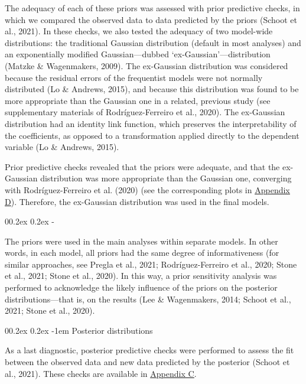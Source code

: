 \documentclass[
  12pt,
  man,floatsintext]{apa7}
\makeatletter
\let\oldparagraph\paragraph
\renewcommand{\paragraph}[1]{\oldparagraph{#1}\mbox{}}
\let\oldsubparagraph\subparagraph
\renewcommand{\subparagraph}[1]{\oldsubparagraph{#1}\mbox{}}
\renewcommand{\paragraph}{\@startsection{paragraph}{4}{\parindent}%
  {0\baselineskip \@plus 0.2ex \@minus 0.2ex}%
  {-1em}%
  {\normalfont\normalsize\bfseries\itshape\typesectitle}}
\renewcommand{\subparagraph}[1]{\@startsection{subparagraph}{5}{1em}%
  {0\baselineskip \@plus 0.2ex \@minus 0.2ex}%
  {-\z@\relax}%
  {\normalfont\normalsize\itshape\hspace{\parindent}{#1}\textit{\addperi}}{\relax}}
\makeatother
\begin{document}
The adequacy of each of these priors was assessed with prior predictive checks, in which we compared the observed data to data predicted by the priors (Schoot et al., 2021). In these checks, we also tested the adequacy of two model-wide distributions: the traditional Gaussian distribution (default in most analyses) and an exponentially modified Gaussian---dubbed `ex-Gaussian'---distribution (Matzke \& Wagenmakers, 2009). The ex-Gaussian distribution was considered because the residual errors of the frequentist models were not normally distributed (Lo \& Andrews, 2015), and because this distribution was found to be more appropriate than the Gaussian one in a related, previous study (see supplementary materials of Rodríguez-Ferreiro et al., 2020). The ex-Gaussian distribution had an identity link function, which preserves the interpretability of the coefficients, as opposed to a transformation applied directly to the dependent variable (Lo \& Andrews, 2015).

Prior predictive checks revealed that the priors were adequate, and that the ex-Gaussian distribution was more appropriate than the Gaussian one, converging with Rodríguez-Ferreiro et al. (2020) (see the corresponding plots in \protect\hyperlink{appendix-D-interaction-plots}{\underline{Appendix D}}). Therefore, the ex-Gaussian distribution was used in the final models.

\hypertarget{prior-sensitivity-analysis}{%
\subparagraph{Prior sensitivity analysis}\label{prior-sensitivity-analysis}}

The priors were used in the main analyses within separate models. In other words, in each model, all priors had the same degree of informativeness (for similar approaches, see Pregla et al., 2021; Rodríguez-Ferreiro et al., 2020; Stone et al., 2021; Stone et al., 2020). In this way, a prior sensitivity analysis was performed to acknowledge the likely influence of the priors on the posterior distributions---that is, on the results (Lee \& Wagenmakers, 2014; Schoot et al., 2021; Stone et al., 2020).

\hypertarget{posterior-distributions}{%
\paragraph{Posterior distributions}\label{posterior-distributions}}

As a last diagnostic, posterior predictive checks were performed to assess the fit between the observed data and new data predicted by the posterior (Schoot et al., 2021). These checks are available in \protect\hyperlink{appendix-C-Bayesian-analysis-diagnostics}{\underline{Appendix C}}.
\end{document}
